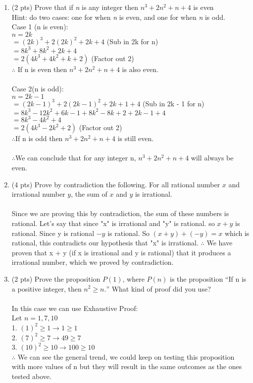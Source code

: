 \documentclass[12pt]{article}
\begin{document}
\begin{enumerate}
\item (2 pts) Prove that if {\it  n }  is any integer then \(n^3+2n^2+n+4\) is even \\
Hint: do two cases: one for when {\it  n }  is even, and one for when {\it  n }  is odd.
\\Case 1 (n is even):
\\$n = 2k$
\\$=(2k)^3 + 2(2k)^2 + 2k + 4$  (Sub in 2k for n)
\\$=8k^3 + 8k^2 + 2k + 4$
\\$=2(4k^3 + 4k^2 + k + 2)$  (Factor out 2)
\\$\therefore$ If n is even then $n^3 + 2n^2 + n + 4$ is also even.\\
\\Case 2(n is odd):
\\$n = 2k - 1$
\\$=(2k - 1)^3 + 2(2k - 1)^2 + 2k + 1 + 4$  (Sub in 2k - 1 for n)
\\$=8k^3 - 12k^2 + 6k - 1 + 8k^2 - 8k + 2 + 2k - 1 + 4$
\\$=8k^3 - 4k^2 + 4$
\\$=2(4k^3 - 2k^2 + 2)$  (Factor out 2)
\\$\therefore$If n is odd then $n^3 + 2n^2 + n + 4$ is still even.\\
\\$\therefore$We can conclude that for any integer n, $n^3 + 2n^2 + n + 4$ will always be even.







\item (4 pts)
 Prove by contradiction the following. For all rational
number $x$ and irrational number $y$, the sum of $x$ and $y$ is
irrational.\\
\\Since we are proving this by contradiction, the sum of these numbers is rational. Let's say that since "x" is irrational and "y" is rational. so $x + y$ is rational. Since y is rational $-y$ is rational. So $(x + y) + (-y) = x$ which is rational, this contradicts our hypothesis that "x" is irrational. $\therefore$ We have proven that x + y (if x is irrational and y is rational) that it produces a irrational number, which we proved by contradiction.

\item (2 pts) Prove the proposition $P(1)$, where $P(n)$ is the proposition
“If n is a positive integer, then $n^2 \geq n.$” What kind of
proof did you use?\\
\\In this case we can use Exhaustive Proof:
\\Let $n = 1,7,10$
\\1. $(1)^2 \geq 1 \rightarrow 1 \geq 1$
\\2. $(7)^2 \geq 7 \rightarrow 49 \geq 7$
\\3. $(10)^2 \geq 10 \rightarrow 100 \geq 10$
\\$\therefore$ We can see the general trend, we could keep on testing this proposition with more values of n but they will result in the same outcomes as the ones tested above.\\



\end{enumerate}
\end{document}
